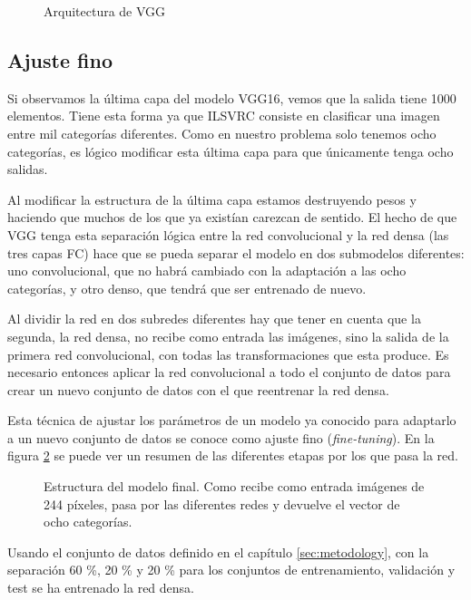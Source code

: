 \begin{figure}
  \caption{Arquitectura de VGG}
\label{vgg16-arch}
\end{figure}

\subsection{Ajuste fino}

Si observamos la última capa del modelo VGG16, vemos que la salida tiene 1000 elementos. Tiene esta forma ya que ILSVRC consiste en clasificar una imagen entre mil categorías diferentes. Como en nuestro problema solo tenemos ocho categorías, es lógico modificar esta última capa para que únicamente tenga ocho salidas.

Al modificar la estructura de la última capa estamos destruyendo pesos y haciendo que muchos de los que ya existían carezcan de sentido. El hecho de que VGG tenga esta separación lógica entre la red convolucional y la red densa (las tres capas FC) hace que se pueda separar el modelo en dos submodelos diferentes: uno convolucional, que no habrá cambiado con la adaptación a las ocho categorías, y otro denso, que tendrá que ser entrenado de nuevo.

Al dividir la red en dos subredes diferentes hay que tener en cuenta que la segunda, la red densa, no recibe como entrada las imágenes, sino la salida de la primera red convolucional, con todas las transformaciones que esta produce. Es necesario entonces aplicar la red convolucional a todo el conjunto de datos para crear un nuevo conjunto de datos con el que reentrenar la red densa.

Esta técnica de ajustar los parámetros de un modelo ya conocido para adaptarlo a un nuevo conjunto de datos se conoce como ajuste fino (\textit{fine-tuning}). En la figura \ref{basic_architecture} se puede ver un resumen de las diferentes etapas por los que pasa la red.

\begin{figure}
  \caption{Estructura del modelo final. Como recibe como entrada imágenes de 244 píxeles, pasa por las diferentes redes y devuelve el vector de ocho categorías.}
\label{basic_architecture}
\end{figure}


Usando el conjunto de datos definido en el capítulo \ref{sec:metodology}, con la separación 60 \%, 20 \% y 20 \% para los conjuntos de entrenamiento, validación y test se ha entrenado la red densa.

